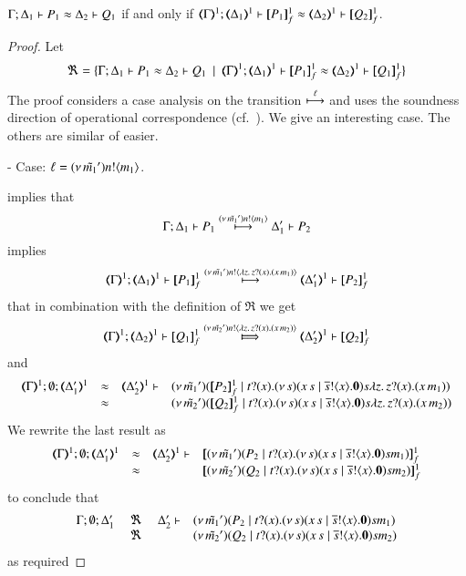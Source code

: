 

\begin{proposition}\rm
	\label{app:prop:fulla_HOp_to_HO}
	$\horel{\Gamma}{\Delta_1}{P_1}{\wb}{\Delta_2}{Q_1}$
	if and only if
	$\horel{\tmap{\Gamma}{1}}{\tmap{\Delta_1}{1}}{\pmapp{P_1}{1}{f}}{\wb}{\tmap{\Delta_2}{1}}{\pmapp{Q_2}{1}{f}}$.
\end{proposition}

\begin{proof}

	\noi Let
%
	\[
		\Re = \set{\horel{\Gamma}{\Delta_1}{P_1}{\wb}{\Delta_2}{Q_1} \setbar \horel{\mapt{\Gamma}^{1}}{\mapt{\Delta_1}^{1}}{\pmapp{P_1}{1}{f}}{\wb}{\mapt{\Delta_2}^{1}}{\pmapp{Q_1}{1}{f}}}
	\]
%
	\noi	The proof considers a case analysis on the transition $\hby{\ell}$ and
		uses the soundness direction of operational correspondence (cf.~).
		We give an interesting case. The others are similar of easier.

	\noi	- Case: $\ell = \news{\tilde{m_1}'} \bactout{n}{m_1}$.

	\noi {} implies that
%
	\[
		\horel{\Gamma}{\Delta_1}{P_1}{\hby{\news{\tilde{m_1}'} \bactout{n}{m_1}}}{\Delta_1'}{P_2}
	\]
%
	\noi implies
%
	\[
		\horel{\mapt{\Gamma}^{1}}{\mapt{\Delta_1}^{1}}{\pmapp{P_1}{1}{f}}{\hby{\news{\tilde{m_1}'} \bactout{n}{\abs{z}{\binp{z}{x} (\appl{x}{m_1})}}}}{\mapt{\Delta_1'}^{1}}{\pmapp{P_2}{1}{f}}
	\]
%
	\noi that in combination with the definition of $\Re$ we get
%
	\begin{eqnarray}
		\horel{\mapt{\Gamma}^{1}}{\mapt{\Delta_2}^{1}}{\pmapp{Q_1}{1}{f}}{\Hby{\news{\tilde{m_2}'} \bactout{n}{\abs{z}{\binp{z}{x} (\appl{x}{m_2})}}}}{\mapt{\Delta_2'}^{1}}{\pmapp{Q_2}{1}{f}}
		\label{prop:HOp_to_HO:full_abs11}
	\end{eqnarray}
%
	\noi and
%
	\[
		\mhorel{\mapt{\Gamma}^{1}}{\mapt{\Delta_1'}^{1}}{\newsp{\tilde{m_1}'}{\pmapp{P_2}{1}{f} 
			\Par 
			\hotrigger{t}{x}{s}{\abs{z}{\binp{z}{x} (\appl{x}{m_1})}} }}
		{\wb}{\mapt{\Delta_2'}^{1}}{}{\newsp{\tilde{m_2}'}{\pmapp{Q_2}{1}{f} 
			\Par 
				\hotrigger{t}{x}{s}{\abs{z}{\binp{z}{x} (\appl{x}{m_2})}}}}
	\]
%
	\noi We rewrite the last result as
	\[
		\mhorel{\mapt{\Gamma}^{1}}{\mapt{\Delta_1'}^{1}}{\pmapp{\newsp{\tilde{m_1}'}{P_2 
			\Par \hotrigger{t}{x}{s}{m_1}}}{1}{f}}
		{\wb}{\mapt{\Delta_2'}^{1}}{}{\pmapp{\newsp{\tilde{m_2}'}{Q_2 \Par \hotrigger{t}{x}{s}{m_2}}}{1}{f}}
	\]
%
	\noi to conclude that
%
	\[
		\mhorel{\Gamma}{\Delta_1'}{\newsp{\tilde{m_1}'}{P_2 \Par \hotrigger{t}{x}{s}{m_1}}}
		{\ \Re\ }{\Delta_2'}{}{\newsp{\tilde{m_2}'}{Q_2 \Par \hotrigger{t}{x}{s}{m_2}}}
	\]
%
	\noi as required



\end{proof}
